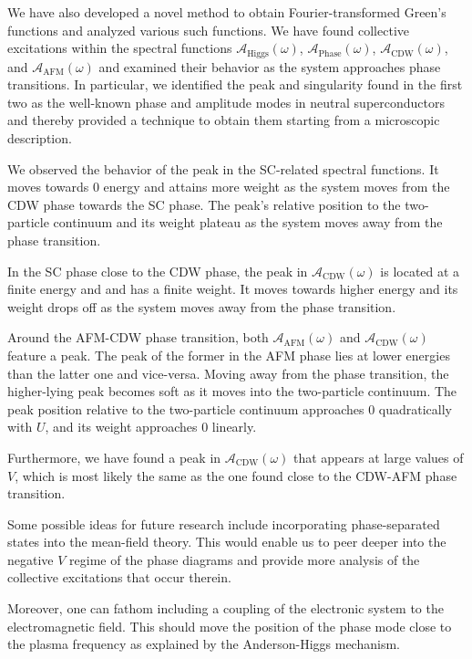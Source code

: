 \documentclass[
    reprint, 
    aps,
    preprintnumbers,
    twocolumn,
    prb,
    superscriptaddress
]{revtex4-2}
\newcommand{\spectral}[1]{\mathcal{A}_\text{#1}  (\omega)}
\begin{document}
We have also developed a novel method to obtain Fourier-transformed Green's functions and analyzed various such functions. 
We have found collective excitations within the spectral functions $\spectral{Higgs}$, $\spectral{Phase}$, $\spectral{CDW}$, and $\spectral{AFM}$ 
and examined their behavior as the system approaches phase transitions. 
In particular, we identified the peak and singularity found in the first two as the well-known phase and amplitude modes in neutral superconductors 
and thereby provided a technique to obtain them starting from a microscopic description.

We observed the behavior of the peak in the SC-related spectral functions.
It moves towards 0 energy and attains more weight as the system moves from the CDW phase towards the SC phase. 
The peak's relative position to the two-particle continuum and its weight plateau as the system moves away from the phase transition.

In the SC phase close to the CDW phase, the peak in $\spectral{CDW}$ is located at a finite energy and and has a finite weight. 
It moves towards higher energy and its weight drops off as the system moves away from the phase transition. 

Around the AFM-CDW phase transition, both $\spectral{AFM}$ and $\spectral{CDW}$ feature a peak. 
The peak of the former in the AFM phase lies at lower energies than the latter one and vice-versa. 
Moving away from the phase transition, the higher-lying peak becomes soft as it moves into the two-particle continuum. 
The peak position relative to the two-particle continuum approaches $0$ quadratically with $U$, and its weight approaches $0$ linearly.

Furthermore, we have found a peak in $\spectral{CDW}$ that appears at large values of $V$, 
which is most likely the same as the one found close to the CDW-AFM phase transition. 


Some possible ideas for future research include incorporating phase-separated states into the mean-field theory.
This would enable us to peer deeper into the negative $V$ regime of the phase diagrams and provide more analysis of the collective excitations that occur therein.

Moreover, one can fathom including a coupling of the electronic system to the electromagnetic field.
This should move the position of the phase mode close to the plasma frequency as explained by the Anderson-Higgs mechanism.
\end{document}
